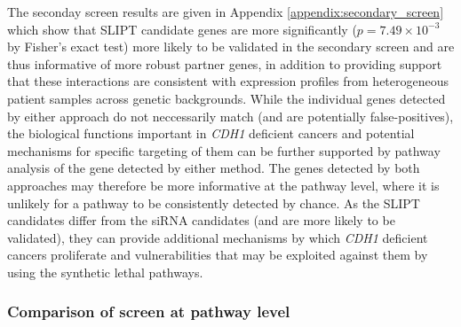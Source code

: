 The seconday screen results are given in Appendix \ref{appendix:secondary_screen} which show that SLIPT candidate genes are more significantly ($p=7.49 \times 10^{-3}$ by Fisher's exact test) more  likely to be validated in the secondary screen and are thus informative of more robust partner genes, in addition to providing support that these interactions are consistent with expression profiles from heterogeneous patient samples across genetic backgrounds. While the individual genes detected by either approach do not neccessarily match (and are potentially false-positives), the biological functions important in \textit{CDH1} deficient cancers and potential mechanisms for specific targeting of them can be further supported by pathway analysis of the gene detected by either method. The genes detected by both approaches may therefore be more informative at the pathway level, where it is unlikely for a pathway to be consistently detected by chance. As the SLIPT candidates differ from the siRNA candidates (and are more likely to be validated), they can provide additional mechanisms by which \textit{CDH1} deficient cancers proliferate and vulnerabilities that may be exploited against them by using the synthetic lethal pathways.

\FloatBarrier

\subsubsection{Comparison of screen at pathway level}  \label{chapt3:compare_pathway}


